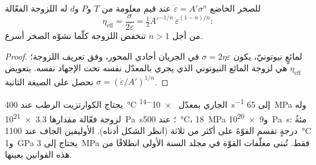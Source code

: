 \begin{proposition}\label{prop:b3:deformation-mechanisms:viscosity}
للصخر الخاضع  $\dot\varepsilon = A'\sigma^n$ عند قيم معلومة من $T$ و$P$
و$d$ له اللزوجة الفعّالة
\[
  \eta_{\mathrm{eff}} = \frac{\sigma}{2\dot\varepsilon}
  = \tfrac12A'^{-1/n}\,\dot\varepsilon^{(1-n)/n}:
\]
من أجل $n > 1$ تنخفض اللزوجة كلّما تشوّه الصخر أسرع.
\end{proposition}

\begin{proof}
لمائعٍ نيوتونيّ، يكون $\sigma = 2\eta\dot\varepsilon$ في الجريان أحادي المحور، وفق تعريف اللزوجة؛
$\eta_{\mathrm{eff}}$ هي لزوجة المائع النيوتوني
الذي يجري بالمعدّل نفسه تحت الإجهاد نفسه. بتعويض
$\sigma = (\dot\varepsilon/A')^{1/n}$ نحصل على الصيغة الثانية.
\end{proof}

يحتاج الكوارتزيت الرطب عند \qty{400}{\celsius} الجاري بمعدّل \qty{e-14}{s^{-1}} إلى
\qty{65}{MPa} وله لزوجة فعّالة مقدارها \qty{3.3e21}{Pa.s}؛ عند
\qty{500}{\celsius}، \qty{18}{MPa} و\qty{9e20}{Pa.s}: مئةُ درجةٍ تقسم القوّةَ
على أكثر من ثلاثة (انظر الشكل أدناه). الأوليفين الجاف عند
\qty{1100}{\celsius} و\qty{1}{GPa} يحتاج إلى \qty{3}{MPa} فقط. تُبنى مغلّفات القوّة
في مجلد السنة الأولى انطلاقًا من هذه القوانين بعينها.

